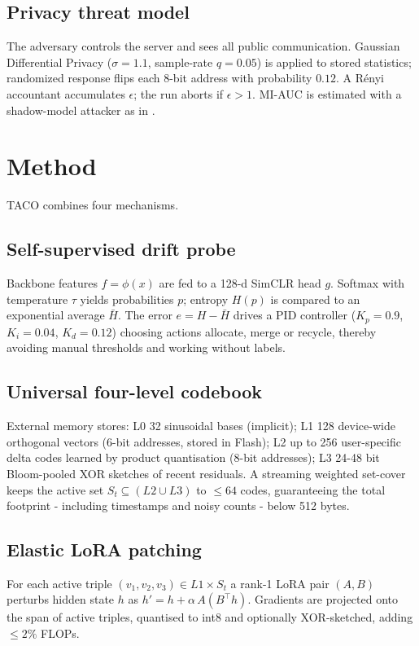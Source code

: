 \documentclass{article}
\begin{document}
\subsection{Privacy threat model}
The adversary controls the server and sees all public communication. Gaussian Differential Privacy ($\sigma=1.1$, sample-rate $q=0.05$) is applied to stored statistics; randomized response flips each 8-bit address with probability $0.12$. A R\'enyi accountant accumulates $\epsilon$; the run aborts if $\epsilon>1$. MI-AUC is estimated with a shadow-model attacker as in \cite{carlini-2016-towards}.

\section{Method}
TACO combines four mechanisms.

\subsection{Self-supervised drift probe}
Backbone features $f=\phi(x)$ are fed to a 128-d SimCLR head $g$. Softmax with temperature $\tau$ yields probabilities $p$; entropy $H(p)$ is compared to an exponential average $\bar{H}$. The error $e=H-\bar{H}$ drives a PID controller ($K_p=0.9$, $K_i=0.04$, $K_d=0.12$) choosing actions allocate, merge or recycle, thereby avoiding manual thresholds and working without labels.

\subsection{Universal four-level codebook}
External memory stores: L0 32 sinusoidal bases (implicit); L1 128 device-wide orthogonal vectors (6-bit addresses, stored in Flash); L2 up to 256 user-specific delta codes learned by product quantisation (8-bit addresses); L3 24-48 bit Bloom-pooled XOR sketches of recent residuals. A streaming weighted set-cover keeps the active set $S_t\subseteq(L2\cup L3)$ to $\leq 64$ codes, guaranteeing the total footprint - including timestamps and noisy counts - below 512 bytes.

\subsection{Elastic LoRA patching}
For each active triple $(v_1,v_2,v_3)\in L1\times S_t$ a rank-1 LoRA pair $(A,B)$ perturbs hidden state $h$ as $h'=h+\alpha\,A(B^{\top}h)$. Gradients are projected onto the span of active triples, quantised to int8 and optionally XOR-sketched, adding $\leq 2\%$ FLOPs.
\end{document}
